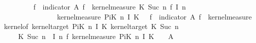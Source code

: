 \begin{isabellebody}
\ \ \ \ \isamarkupfalse%
\isanewline
\ \ \isamarkupfalse%
\ {}{\isacharcolon}{\kern0pt}\ {\isachardoublequoteopen}{\isacharparenleft}{\kern0pt}{\isasymintegral}\isactrlsup {\isacharplus}{\kern0pt}{\isasymomega}\isactrlsub f{\isachardot}{\kern0pt}\ {\isacharparenleft}{\kern0pt}{\isasymintegral}\isactrlsup {\isacharplus}{\kern0pt}{\isasymomega}{\isachardot}{\kern0pt}\ indicator\ A{\isacharprime}{\kern0pt}\ {\isacharparenleft}{\kern0pt}{\isasymomega}\isactrlsub f{\isacharcomma}{\kern0pt}\ {\isasymomega}{\isacharparenright}{\kern0pt}\ {\isasympartial}kernel{\isacharunderscore}{\kern0pt}measure\ {\isacharparenleft}{\kern0pt}{\isacharquery}{\kern0pt}K\ {\isacharparenleft}{\kern0pt}Suc\ n{\isacharparenright}{\kern0pt}{\isacharparenright}{\kern0pt}\ {\isacharparenleft}{\kern0pt}{\isasymomega}\isactrlsub f\ {\isacharparenleft}{\kern0pt}I\ n{\isacharparenright}{\kern0pt}{\isacharparenright}{\kern0pt}{\isacharparenright}{\kern0pt}\isanewline
\ \ \ \ \ \ \ \ \ \ \ \ \ \ \ \ {\isasympartial}kernel{\isacharunderscore}{\kern0pt}measure\ {\isacharparenleft}{\kern0pt}PiK\ n\ I\ K{\isacharparenright}{\kern0pt}\ {\isasymomega}{\isacharparenright}{\kern0pt}\ {\isacharequal}{\kern0pt}\ {\isacharparenleft}{\kern0pt}{\isasymintegral}\isactrlsup {\isacharplus}{\kern0pt}{\isasymomega}\isactrlsub f{\isachardot}{\kern0pt}\ {\isacharparenleft}{\kern0pt}{\isasymintegral}\isactrlsup {\isacharplus}{\kern0pt}{\isasymomega}{\isachardot}{\kern0pt}\ indicator\ A{\isacharprime}{\kern0pt}\ {\isacharparenleft}{\kern0pt}{\isasymomega}\isactrlsub f{\isacharcomma}{\kern0pt}\ {\isasymomega}{\isacharparenright}{\kern0pt}\ {\isasympartial}kernel{\isacharunderscore}{\kern0pt}measure\ {\isacharparenleft}{\kern0pt}kernel{\isacharunderscore}{\kern0pt}of\ {\isacharparenleft}{\kern0pt}kernel{\isacharunderscore}{\kern0pt}target\ {\isacharparenleft}{\kern0pt}PiK\ n\ I\ K{\isacharparenright}{\kern0pt}{\isacharparenright}{\kern0pt}\ {\isacharparenleft}{\kern0pt}kernel{\isacharunderscore}{\kern0pt}target\ {\isacharparenleft}{\kern0pt}{\isacharquery}{\kern0pt}K\ {\isacharparenleft}{\kern0pt}Suc\ n{\isacharparenright}{\kern0pt}{\isacharparenright}{\kern0pt}{\isacharparenright}{\kern0pt}\isanewline
\ \ \ \ {\isacharparenleft}{\kern0pt}{\isasymlambda}{\isasymomega}{\isachardot}{\kern0pt}\ {\isacharquery}{\kern0pt}K\ {\isacharparenleft}{\kern0pt}Suc\ n{\isacharparenright}{\kern0pt}\ {\isacharparenleft}{\kern0pt}{\isasymomega}\ {\isacharparenleft}{\kern0pt}I\ n{\isacharparenright}{\kern0pt}{\isacharparenright}{\kern0pt}{\isacharparenright}{\kern0pt}{\isacharparenright}{\kern0pt}\ {\isasymomega}\isactrlsub f{\isacharparenright}{\kern0pt}\ {\isasympartial}kernel{\isacharunderscore}{\kern0pt}measure\ {\isacharparenleft}{\kern0pt}PiK\ n\ I\ K{\isacharparenright}{\kern0pt}\ {\isasymomega}{\isacharparenright}{\kern0pt}{\isachardoublequoteclose}\ \ {\isasymomega}\ A{\isacharprime}{\kern0pt}\isanewline

\end{isabellebody}
